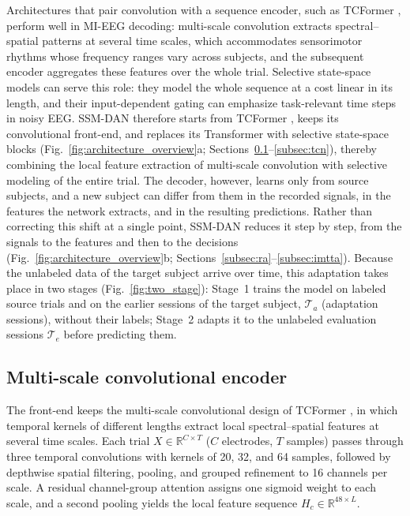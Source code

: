 \documentclass[preprint,12pt]{elsarticle}
\begin{document}
Architectures that pair convolution with a sequence encoder, such as TCFormer \cite{altaheri2025tcformer}, perform well in MI-EEG decoding: multi-scale convolution extracts spectral--spatial patterns at several time scales, which accommodates sensorimotor rhythms whose frequency ranges vary across subjects, and the subsequent encoder aggregates these features over the whole trial. Selective state-space models \cite{gu2024mamba} can serve this role: they model the whole sequence at a cost linear in its length, and their input-dependent gating can emphasize task-relevant time steps in noisy EEG. SSM-DAN therefore starts from TCFormer \cite{altaheri2025tcformer}, keeps its convolutional front-end, and replaces its Transformer with selective state-space blocks (Fig.~\ref{fig:architecture_overview}a; Sections~\ref{subsec:conv_frontend}--\ref{subsec:tcn}), thereby combining the local feature extraction of multi-scale convolution with selective modeling of the entire trial. The decoder, however, learns only from source subjects, and a new subject can differ from them in the recorded signals, in the features the network extracts, and in the resulting predictions. Rather than correcting this shift at a single point, SSM-DAN reduces it step by step, from the signals to the features and then to the decisions (Fig.~\ref{fig:architecture_overview}b; Sections~\ref{subsec:ra}--\ref{subsec:imtta}). Because the unlabeled data of the target subject arrive over time, this adaptation takes place in two stages (Fig.~\ref{fig:two_stage}): Stage~1 trains the model on labeled source trials and on the earlier sessions of the target subject, $\mathcal{T}_a$ (adaptation sessions), without their labels; Stage~2 adapts it to the unlabeled evaluation sessions $\mathcal{T}_e$ before predicting them.

\subsection{Multi-scale convolutional encoder}
\label{subsec:conv_frontend}

The front-end keeps the multi-scale convolutional design of TCFormer \cite{altaheri2025tcformer}, in which temporal kernels of different lengths extract local spectral--spatial features at several time scales. Each trial $X\in\mathbb{R}^{C\times T}$ ($C$ electrodes, $T$ samples) passes through three temporal convolutions with kernels of 20, 32, and 64 samples, followed by depthwise spatial filtering, pooling, and grouped refinement to 16 channels per scale. A residual channel-group attention assigns one sigmoid weight to each scale, and a second pooling yields the local feature sequence $H_c\in\mathbb{R}^{48\times L}$.
\end{document}
